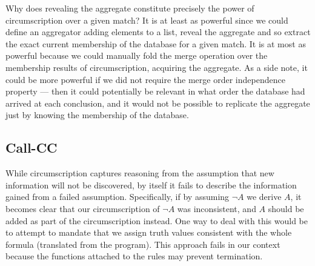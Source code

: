 Why does revealing the aggregate constitute precisely the power of circumscription over a given match?
It is at least as powerful since we could define an aggregator adding elements to a list, reveal the aggregate and so extract the exact current membership of the database for a given match.
It is at most as powerful because we could manually fold the merge operation over the membership results of circumscription, acquiring the aggregate.
As a side note, it could be more powerful if we did not require the merge order independence property --- then it could potentially be relevant in what order the database had arrived at each conclusion, and it would not be possible to replicate the aggregate just by knowing the membership of the database.

\subsection{Call-CC}
While circumscription captures reasoning from the assumption that new information will not be discovered, by itself it fails to describe the information gained from a failed assumption.
Specifically, if by assuming $\neg A$ we derive $A$, it becomes clear that our circumscription of $\neg A$ was inconsistent, and $A$ should be added as part of the circumscription instead.
One way to deal with this would be to attempt to mandate that we assign truth values consistent with the whole formula (translated from the program).
This approach fails in our context because the functions attached to the rules may prevent termination.

